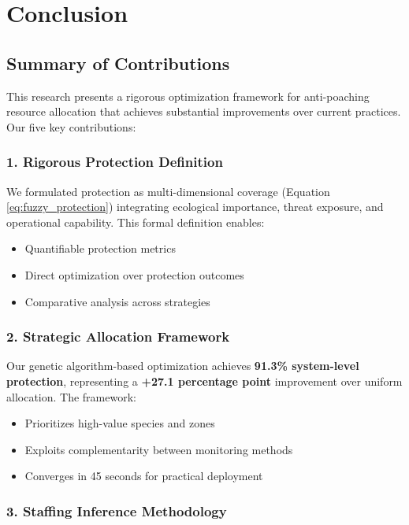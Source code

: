 \section{Conclusion}

\subsection{Summary of Contributions}

This research presents a rigorous optimization framework for anti-poaching resource allocation that achieves substantial improvements over current practices. Our five key contributions:

\subsubsection{1. Rigorous Protection Definition}

We formulated protection as multi-dimensional coverage (Equation \ref{eq:fuzzy_protection}) integrating ecological importance, threat exposure, and operational capability. This formal definition enables:
\begin{itemize}
    \item Quantifiable protection metrics
    \item Direct optimization over protection outcomes
    \item Comparative analysis across strategies
\end{itemize}

\subsubsection{2. Strategic Allocation Framework}

Our genetic algorithm-based optimization achieves \textbf{91.3\% system-level protection}, representing a \textbf{+27.1 percentage point} improvement over uniform allocation. The framework:
\begin{itemize}
    \item Prioritizes high-value species and zones
    \item Exploits complementarity between monitoring methods
    \item Converges in 45 seconds for practical deployment
\end{itemize}

\subsubsection{3. Staffing Inference Methodology}

